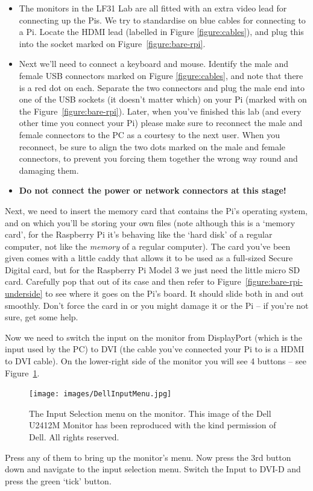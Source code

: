 \begin{itemize}
\item The monitors in the LF31 Lab are all fitted with an extra video lead for connecting up the Pis. We try to standardise on blue cables for connecting to a Pi. Locate the HDMI lead (labelled \protect{} in Figure \ref{figure:cables}), and plug this into the socket marked  on Figure~\ref{figure:bare-rpi}.
\item Next we'll need to connect a keyboard and mouse. Identify the male and female USB connectors marked \protect{} on Figure \ref{figure:cables}, and note that there is a red dot on each. Separate the two connectors and plug the male end into one of the USB sockets (it doesn't matter which) on your Pi (marked with \protect{} on the Figure~\ref{figure:bare-rpi}). Later, when you've finished this lab (and every other time you connect your Pi) please make sure to reconnect the male and female connectors to the PC as a courtesy to the next user. When you reconnect, be sure to align the two dots marked on the male and female connectors, to prevent you forcing them together the wrong way round and damaging them.
\item \textbf{Do not connect the power or network connectors at this stage!}
\end{itemize}

Next, we need to insert the memory card that contains the Pi's operating system, and on which you'll be storing your own files (note although this is a `memory card', for the Raspberry Pi it's behaving like the `hard disk' of a regular computer, not like the \textit{memory} of a regular computer). The card you've been given comes with a little caddy that allows it to be used as a full-sized Secure Digital card, but for the Raspberry Pi Model 3 we just need the little micro SD card. Carefully pop that out of its case and then refer to Figure~\ref{figure:bare-rpi-underside} to see where it goes on the Pi's board. It should slide both in and out smoothly. Don't force the card in or you might damage it or the Pi -- if you're not sure, get some help.

Now we need to switch the input on the monitor from DisplayPort (which
is the input used by the PC) to DVI (the cable you've
connected your Pi to is a HDMI to DVI cable). On the lower-right side
of the monitor you will see 4 buttons -- see
Figure~\ref{figure:monitorswitch}. 
%
\begin{figure}
\centerline{\texttt{[image: images/DellInputMenu.jpg]}}
\caption{The Input Selection menu on the monitor. This image of the Dell U2412M Monitor has been reproduced with the kind permission of Dell. All rights reserved.}\label{figure:monitorswitch}
\end{figure}
%
Press any of them to bring up the
monitor's menu. Now press the 3rd button down and navigate to the
input selection menu. Switch the Input to DVI-D and press the green `tick' button.

